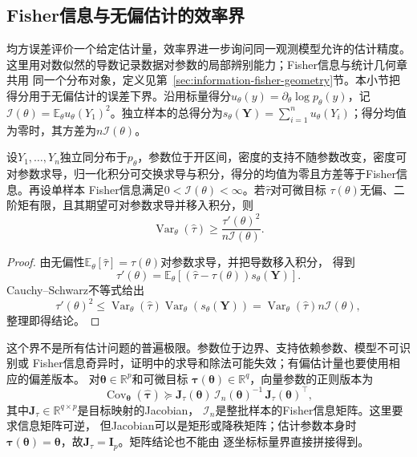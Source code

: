 \subsection{Fisher信息与无偏估计的效率界}
均方误差评价一个给定估计量，效率界进一步询问同一观测模型允许的估计精度。
这里用对数似然的导数记录数据对参数的局部辨别能力；Fisher信息与统计几何章共用
同一个分布对象，定义见第~\ref{sec:information-fisher-geometry}节。本小节把得分用于无偏估计的误差下界。沿用标量得分\(u_\theta(y)=\partial_\theta\log p_\theta(y)\)，记\(\mathcal I(\theta)=\mathbb E_\theta u_\theta(Y_1)^2\)。独立样本的总得分为\(s_\theta(\bm Y)=\sum_{i=1}^n u_\theta(Y_i)\)；得分均值为零时，其方差为\(n\mathcal I(\theta)\)。

\begin{theorem}
\label{thm:statistics-cramer-rao}
设\(Y_1,\ldots,Y_n\)独立同分布于\(p_\theta\)，参数位于开区间，密度的支持不随参数改变，密度可对参数求导，归一化积分可交换求导与积分，得分的均值为零且方差等于Fisher信息。再设单样本
Fisher信息满足\(0<\mathcal I(\theta)<\infty\)。若\(\widehat\tau\)对可微目标
\(\tau(\theta)\)无偏、二阶矩有限，且其期望可对参数求导并移入积分，则
\[
  \operatorname{Var}_\theta(\widehat\tau)
  \geq\frac{\tau'(\theta)^2}{n\mathcal I(\theta)}.
\]
\end{theorem}

\begin{proof}
由无偏性\(\mathbb{E}_\theta[\widehat\tau]=\tau(\theta)\)对参数求导，并把导数移入积分，
得到
\[
  \tau'(\theta)
  =\mathbb{E}_\theta[
    (\widehat\tau-\tau(\theta))s_\theta(\bm Y)].
\]
Cauchy--Schwarz不等式给出
\[
  \tau'(\theta)^2\leq
  \operatorname{Var}_\theta(\widehat\tau)
  \operatorname{Var}_\theta(s_\theta(\bm Y))
  =
  \operatorname{Var}_\theta(\widehat\tau)n\mathcal I(\theta),
\]
整理即得结论。
\end{proof}

这个界不是所有估计问题的普遍极限。参数位于边界、支持依赖参数、模型不可识别或
Fisher信息奇异时，证明中的求导和除法可能失效；有偏估计量也要使用相应的偏差版本。
对\(\bm\theta\in\mathbb{R}^p\)和可微目标
\(\bm\tau(\bm\theta)\in\mathbb{R}^q\)，向量参数的正则版本为
\[
  \operatorname{Cov}_{\bm\theta}(\widehat{\bm\tau})
  \succeq
  \bm J_\tau(\bm\theta)\,
  \bm{\mathcal I}_n(\bm\theta)^{-1}\,
  \bm J_\tau(\bm\theta)^\top,
\]
其中\(\bm J_\tau\in\mathbb{R}^{q\times p}\)是目标映射的Jacobian，
\(\bm{\mathcal I}_n\)是整批样本的Fisher信息矩阵。这里要求信息矩阵可逆，
但Jacobian可以是矩形或降秩矩阵；估计参数本身时
\(\bm\tau(\bm\theta)=\bm\theta\)，故\(\bm J_\tau=\bm I_p\)。矩阵结论也不能由
逐坐标标量界直接拼接得到。
